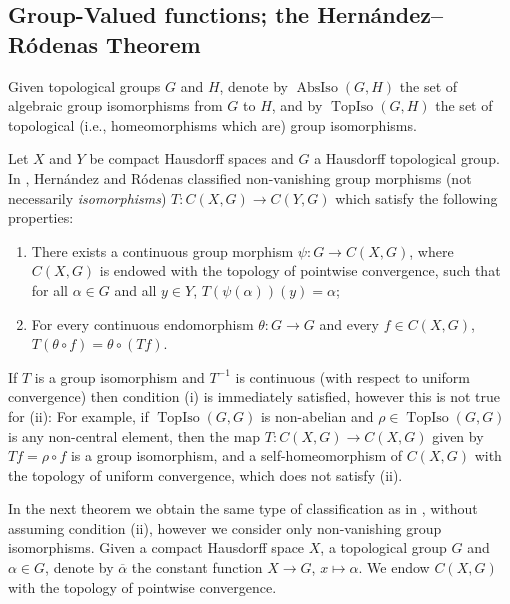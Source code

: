 \documentclass[letter,11pt]{amsart}
\theoremstyle{plain}		\newtheorem{theorem}[generalnumbering]{Theorem}
\theoremstyle{plain}		\newtheorem{corollary}[generalnumbering]{Corollary}
\theoremstyle{definition}		\newtheorem{definition}[generalnumbering]{Definition}
\theoremstyle{definition}		\newtheorem{example}[generalnumbering]{Example}
\theoremstyle{plain}		\newtheorem{proposition}[generalnumbering]{Proposition}
\theoremstyle{plain}		\newtheorem{lemma}[generalnumbering]{Lemma}
\theoremstyle{definition}
\begin{document}
\subsection{Group-Valued functions; the Hernández--Ródenas Theorem}

Given topological groups $G$ and $H$, denote by $\operatorname{AbsIso}(G,H)$ the set of algebraic group isomorphisms from $G$ to $H$, and by $\operatorname{TopIso}(G,H)$ the set of topological (i.e., homeomorphisms which are) group isomorphisms.

Let $X$ and $Y$ be compact Hausdorff spaces and $G$ a Hausdorff topological group. In \cite[Theorem 3.7]{MR2324919}, Hernández and Ródenas classified non-vanishing group morphisms (not necessarily \emph{isomorphisms}) $T\colon C(X,G)\to C(Y,G)$ which satisfy the following properties:
\begin{enumerate}[label=(\roman*)]
	\item There exists a continuous group morphism $\psi\colon G\to C(X,G)$, where $C(X,G)$ is endowed with the topology of pointwise convergence, such that for all $\alpha\in G$ and all $y\in Y$, $T(\psi(\alpha))(y)=\alpha$;
	\item For every continuous endomorphism $\theta\colon G\to G$ and every $f\in C(X,G)$, $T(\theta\circ f)=\theta\circ (Tf)$.
\end{enumerate}
If $T$ is a group isomorphism and $T^{-1}$ is continuous (with respect to uniform convergence) then condition (i) is immediately satisfied, however this is not true for (ii): For example, if $\operatorname{TopIso}(G,G)$ is non-abelian and $\rho\in\operatorname{TopIso}(G,G)$ is any non-central element, then the map $T\colon C(X,G)\to C(X,G)$ given by $Tf=\rho\circ f$ is a group isomorphism, and a self-homeomorphism of $C(X,G)$ with the topology of uniform convergence, which does not satisfy (ii).

In the next theorem we obtain the same type of classification as in \cite[Theorem 3.7]{MR2324919}, without assuming condition (ii), however we consider only non-vanishing group isomorphisms. Given a compact Hausdorff space $X$, a topological group $G$ and $\alpha\in G$, denote by $\overline{\alpha}$ the constant function $X\to G$, $x\mapsto \alpha$. We endow $C(X,G)$ with the topology of pointwise convergence.
\end{document}

